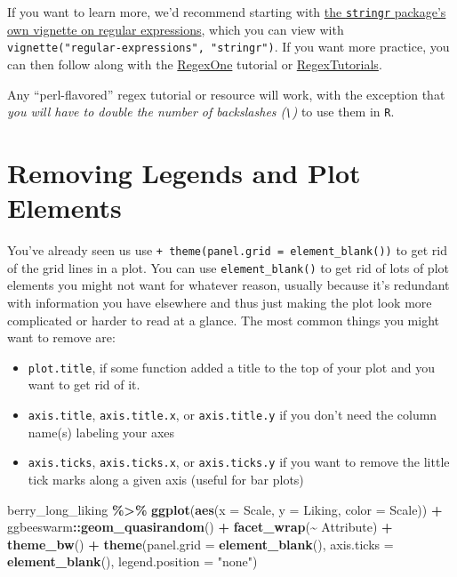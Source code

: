 \documentclass[
]{book}
\newenvironment{Shaded}{\begin{snugshade}}{\end{snugshade}}
\newcommand{\AttributeTok}[1]{\textcolor[rgb]{0.13,0.29,0.53}{#1}}
\newcommand{\FunctionTok}[1]{\textcolor[rgb]{0.13,0.29,0.53}{\textbf{#1}}}
\newcommand{\NormalTok}[1]{#1}
\newcommand{\SpecialCharTok}[1]{\textcolor[rgb]{0.81,0.36,0.00}{\textbf{#1}}}
\newcommand{\StringTok}[1]{\textcolor[rgb]{0.31,0.60,0.02}{#1}}
\providecommand{\tightlist}{%
  \setlength{\itemsep}{0pt}\setlength{\parskip}{0pt}}
\begin{document}
If you want to learn more, we'd recommend starting with \href{https://stringr.tidyverse.org/articles/regular-expressions.html}{the \texttt{stringr} package's own vignette on regular expressions}, which you can view with \texttt{vignette("regular-expressions",\ "stringr")}. If you want more practice, you can then follow along with the \href{https://regexone.com/}{RegexOne} tutorial or \href{http://regextutorials.com/index.html}{RegexTutorials}.

Any ``perl-flavored'' regex tutorial or resource will work, with the exception that \emph{you will have to double the number of backslashes (\texttt{\textbackslash{}})} to use them in \texttt{R}.

\hypertarget{removing-legends-and-plot-elements}{%
\section{Removing Legends and Plot Elements}\label{removing-legends-and-plot-elements}}

You've already seen us use \texttt{+\ theme(panel.grid\ =\ element\_blank())} to get rid of the grid lines in a plot. You can use \texttt{element\_blank()} to get rid of lots of plot elements you might not want for whatever reason, usually because it's redundant with information you have elsewhere and thus just making the plot look more complicated or harder to read at a glance. The most common things you might want to remove are:

\begin{itemize}
\tightlist
\item
  \texttt{plot.title}, if some function added a title to the top of your plot and you want to get rid of it.
\item
  \texttt{axis.title}, \texttt{axis.title.x}, or \texttt{axis.title.y} if you don't need the column name(s) labeling your axes
\item
  \texttt{axis.ticks}, \texttt{axis.ticks.x}, or \texttt{axis.ticks.y} if you want to remove the little tick marks along a given axis (useful for bar plots)
\end{itemize}

\begin{Shaded}
\begin{Highlighting}[]
\NormalTok{berry\_long\_liking }\SpecialCharTok{\%\textgreater{}\%}
  \FunctionTok{ggplot}\NormalTok{(}\FunctionTok{aes}\NormalTok{(}\AttributeTok{x =}\NormalTok{ Scale, }\AttributeTok{y =}\NormalTok{ Liking, }\AttributeTok{color =}\NormalTok{ Scale)) }\SpecialCharTok{+}
\NormalTok{  ggbeeswarm}\SpecialCharTok{::}\FunctionTok{geom\_quasirandom}\NormalTok{() }\SpecialCharTok{+}
  \FunctionTok{facet\_wrap}\NormalTok{(}\SpecialCharTok{\textasciitilde{}}\NormalTok{ Attribute) }\SpecialCharTok{+}
  \FunctionTok{theme\_bw}\NormalTok{() }\SpecialCharTok{+}
  \FunctionTok{theme}\NormalTok{(}\AttributeTok{panel.grid =} \FunctionTok{element\_blank}\NormalTok{(),}
        \AttributeTok{axis.ticks =} \FunctionTok{element\_blank}\NormalTok{(),}
        \AttributeTok{legend.position =} \StringTok{"none"}\NormalTok{)}
\end{Highlighting}
\end{Shaded}
\end{document}
